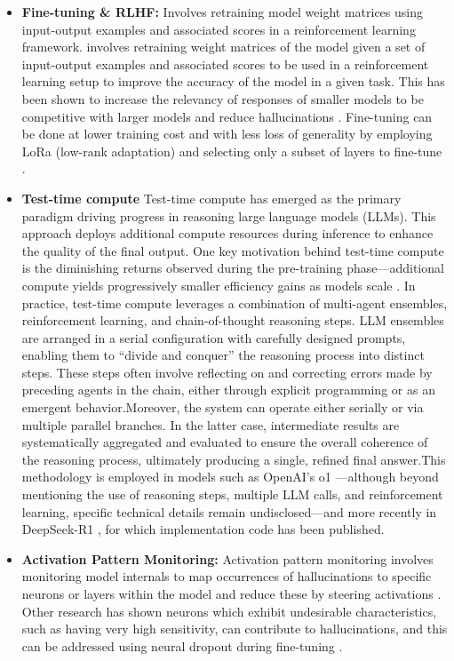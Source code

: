 \begin{itemize}
    \item \textbf{Fine-tuning \& RLHF:} Involves retraining model weight matrices using input-output examples and associated scores in a reinforcement learning framework. involves retraining weight matrices of the model given a set of input-output examples and associated scores to be used in a reinforcement learning setup to improve the accuracy of the model in a given task. This has been shown to increase the relevancy of responses of smaller models to be competitive with larger models and reduce hallucinations \cite{ouyang2022rlhf}. Fine-tuning can be done at lower training cost and with less loss of generality by employing LoRa (low-rank adaptation) and selecting only a subset of layers to fine-tune \cite{hu2021lora}.  
    \item \textbf{Test-time compute}
  Test-time compute has emerged as the primary paradigm driving progress in reasoning large language models (LLMs). This approach deploys additional compute resources during inference to enhance the quality of the final output. One key motivation behind test-time compute is the diminishing returns observed during the pre-training phase—additional compute yields progressively smaller efficiency gains as models scale \cite{kaplan2020scaling}. In practice, test-time compute leverages a combination of multi-agent ensembles, reinforcement learning, and chain-of-thought reasoning steps. LLM ensembles are arranged in a serial configuration with carefully designed prompts, enabling them to “divide and conquer” the reasoning process into distinct steps. These steps often involve reflecting on and correcting errors made by preceding agents in the chain, either through explicit programming or as an emergent behavior.Moreover, the system can operate either serially or via multiple parallel branches. In the latter case, intermediate results are systematically aggregated and evaluated to ensure the overall coherence of the reasoning process, ultimately producing a single, refined final answer.This methodology is employed in models such as OpenAI's o1 \cite{openai2024reasoning}—although beyond mentioning the use of reasoning steps, multiple LLM calls, and reinforcement learning, specific technical details remain undisclosed—and more recently in DeepSeek-R1 \cite{guo2025deepseek}, for which implementation code has been published.
    \item \textbf{Activation Pattern Monitoring:} Activation pattern monitoring involves monitoring model internals to map occurrences of hallucinations to specific neurons or layers within the model and reduce these by steering activations \cite{wang2024adaptive}. Other research has shown neurons which exhibit undesirable characteristics, such as having very high sensitivity, can contribute to hallucinations, and this can be addressed using neural dropout during fine-tuning \cite{varshney2023stitch}.

\end{itemize}
